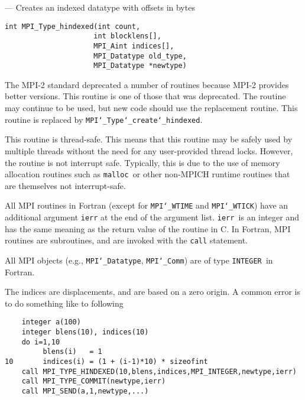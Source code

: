 \startmanpage
{}
--- Creates an indexed datatype with offsets in bytes 
\startvb\begin{verbatim}
int MPI_Type_hindexed(int count,
                     int blocklens[],
                     MPI_Aint indices[],
                     MPI_Datatype old_type,
                     MPI_Datatype *newtype)

\end{verbatim}
\endvb

\par
{}
\par
{}
The MPI-2 standard deprecated a number of routines because MPI-2 provides
better versions.  This routine is one of those that was deprecated.  The
routine may continue to be used, but new code should use the replacement
routine.
This routine is replaced by {\tt MPI{\tt \char`\_}Type{\tt \char`\_}create{\tt \char`\_}hindexed}.
\par
{}
\par
This routine is thread-safe.  This means that this routine may be
safely used by multiple threads without the need for any user-provided
thread locks.  However, the routine is not interrupt safe.  Typically,
this is due to the use of memory allocation routines such as {\tt malloc
}or other non-MPICH runtime routines that are themselves not interrupt-safe.
\par
{}
All MPI routines in Fortran (except for {\tt MPI{\tt \char`\_}WTIME} and {\tt MPI{\tt \char`\_}WTICK}) have
an additional argument {\tt ierr} at the end of the argument list.  {\tt ierr
}is an integer and has the same meaning as the return value of the routine
in C.  In Fortran, MPI routines are subroutines, and are invoked with the
{\tt call} statement.
\par
All MPI objects (e.g., {\tt MPI{\tt \char`\_}Datatype}, {\tt MPI{\tt \char`\_}Comm}) are of type {\tt INTEGER
}in Fortran.
\par
The indices are displacements, and are based on a zero origin.  A common error
is to do something like to following
\begin{verbatim}
    integer a(100)
    integer blens(10), indices(10)
    do i=1,10
         blens(i)   = 1
10       indices(i) = (1 + (i-1)*10) * sizeofint
    call MPI_TYPE_HINDEXED(10,blens,indices,MPI_INTEGER,newtype,ierr)
    call MPI_TYPE_COMMIT(newtype,ierr)
    call MPI_SEND(a,1,newtype,...)
\end{verbatim}

